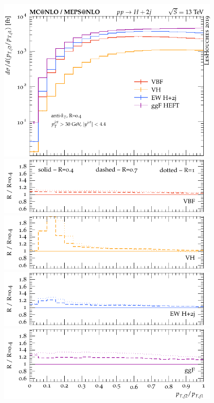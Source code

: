\documentclass[10pt,prd,fleqn,superscriptaddress,notitlepage,nofootinbib,preprintnumbers,nobalancelastpage]{revtex4-1}
\begin{document}
\begin{figure}[p]
\centering
  \begin{minipage}{.2925\textwidth}
    \includegraphics[width=\textwidth]{figures/channels/pt2_pt1.pdf}
    \includegraphics[width=\textwidth]{figures/channels/pt2_pt1_rVBF.pdf}
    \includegraphics[width=\textwidth]{figures/channels/pt2_pt1_rVH.pdf}
    \includegraphics[width=\textwidth]{figures/channels/pt2_pt1_rHJJ.pdf}
    \includegraphics[width=\textwidth]{figures/channels/pt2_pt1_rGGH.pdf}

\end{minipage}
\end{figure}
\end{document}
